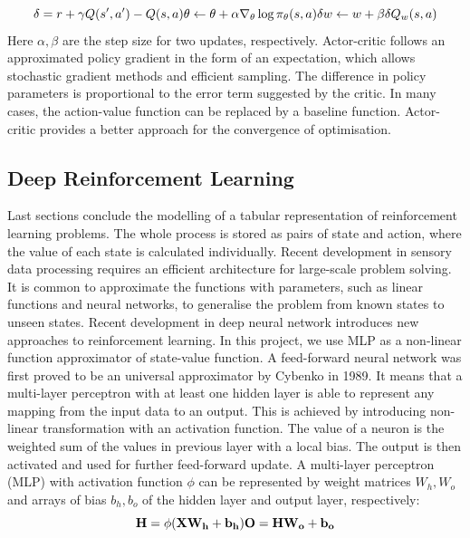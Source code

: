 \documentclass[oneside,11pt,a4paper]{article}
\begin{document}
$$
\delta = r + \gamma Q(s',a') - Q(s,a)\\ \theta \leftarrow \theta +\alpha\nabla_\theta\log\pi_\theta(s,a)\delta \\ w\leftarrow w+\beta\delta Q_w(s,a)
$$
Here $\alpha, \beta$ are the step size for two updates, respectively. Actor-critic follows an approximated policy gradient in the form of an expectation, which allows stochastic gradient methods and efficient sampling. The difference in policy parameters is proportional to the error term suggested by the critic. In many cases, the action-value function can be replaced by a baseline function. Actor-critic provides a better approach for the convergence of optimisation.
\newline
\newline
\noindent
\subsection{Deep Reinforcement Learning}
Last sections conclude the modelling of a tabular representation of reinforcement learning problems. The whole process is stored as pairs of state and action, where the value of each state is calculated individually. Recent development in sensory data processing requires an efficient architecture for large-scale problem solving. It is common to approximate the functions with parameters, such as linear functions and neural networks, to generalise the problem from known states to unseen states.
\newline
\newline
\noindent
Recent development in deep neural network introduces new approaches to reinforcement learning. In this project, we use MLP as a non-linear function approximator of state-value function. A feed-forward neural network was first proved to be an universal approximator by Cybenko in 1989. It means that a multi-layer perceptron with at least one hidden layer is able to represent any mapping from the input data to an output. This is achieved by introducing non-linear transformation with an activation function. The value of a neuron is the weighted sum of the values in previous layer with a local bias. The output is then activated and used for further feed-forward update. A multi-layer perceptron (MLP) with activation function $\phi$ can be represented by weight matrices $W_h, W_o$ and arrays of bias $b_h, b_o$ of the hidden layer and output layer, respectively:
$$
\mathbf {H = \phi(XW_h + b_h) \\
    O = HW_o+b_o}
$$
\end{document}
